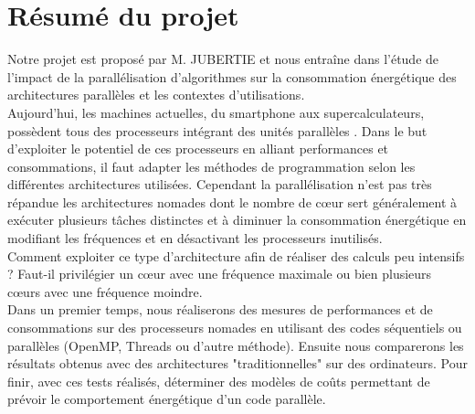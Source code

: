 \chapter{Résumé du projet}

Notre projet est proposé par M. JUBERTIE et nous entraîne dans l'étude de l'impact de la parallélisation d'algorithmes sur la consommation énergétique des architectures parallèles et les contextes d'utilisations.\\ 
Aujourd'hui, les machines actuelles, du smartphone aux supercalculateurs, possèdent tous des processeurs intégrant des unités parallèles . Dans le but d'exploiter le potentiel de ces processeurs en alliant performances et consommations, il faut adapter les méthodes de programmation selon les différentes architectures utilisées. Cependant la parallélisation n'est pas très répandue les architectures nomades dont le nombre de cœur sert généralement à exécuter plusieurs tâches distinctes et à diminuer la consommation énergétique en modifiant les fréquences et en désactivant les processeurs inutilisés.
\\ 
Comment exploiter ce type d'architecture afin de réaliser des calculs peu intensifs ? Faut-il privilégier un cœur avec une fréquence maximale ou bien plusieurs cœurs avec une fréquence moindre.
\\Dans un premier temps, nous réaliserons des mesures de performances et de consommations sur des processeurs nomades en utilisant des codes séquentiels ou parallèles (OpenMP, Threads ou d'autre méthode).
Ensuite nous comparerons les résultats obtenus avec des architectures "traditionnelles" sur des ordinateurs.
Pour finir, avec ces tests réalisés, déterminer des modèles de coûts permettant de prévoir le comportement énergétique d'un code parallèle.
       